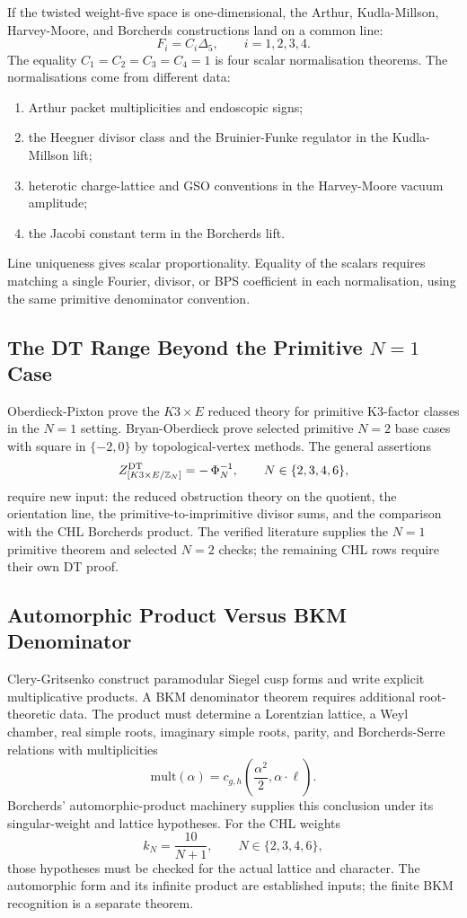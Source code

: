 If the twisted weight-five space is one-dimensional, the Arthur,
Kudla-Millson, Harvey-Moore, and Borcherds constructions land on a
common line:
\[
  F_i=C_i\Delta_5,\qquad i=1,2,3,4 .
\]
The equality \(C_1=C_2=C_3=C_4=1\) is four scalar normalisation
theorems.  The normalisations come from different data:
\begin{enumerate}[label=\textup{(\roman*)}]
\item Arthur packet multiplicities and endoscopic signs;
\item the Heegner divisor class and the Bruinier-Funke regulator in the
Kudla-Millson lift;
\item heterotic charge-lattice and GSO conventions in the
Harvey-Moore vacuum amplitude;
\item the Jacobi constant term in the Borcherds lift.
\end{enumerate}
Line uniqueness gives scalar proportionality.  Equality of the scalars
requires matching a single Fourier, divisor, or BPS coefficient in each
normalisation, using the same primitive denominator convention.

\subsection*{The DT Range Beyond the Primitive \(N=1\) Case}
\label{subsec:dt-range}

Oberdieck-Pixton prove the \(K3\times E\) reduced theory for primitive
K3-factor classes in the \(N=1\) setting.  Bryan-Oberdieck prove
selected primitive \(N=2\) base cases with square in \(\{-2,0\}\) by
topological-vertex methods.  The general assertions
\[
  Z^{\mathrm{DT}}_{[K3\times E/\mathbb{Z}_N]}
  =
  -\,\Phi_N^{-1},
  \qquad
  N\in\{2,3,4,6\},
\]
require new input: the reduced obstruction theory on the quotient, the
orientation line, the primitive-to-imprimitive divisor sums, and the
comparison with the CHL Borcherds product.  The verified literature
supplies the \(N=1\) primitive theorem and selected \(N=2\) checks; the
remaining CHL rows require their own DT proof.

\subsection*{Automorphic Product Versus BKM Denominator}
\label{subsec:automorphic-product-bkm}

Clery-Gritsenko construct paramodular Siegel cusp forms and write
explicit multiplicative products.  A BKM denominator theorem requires
additional root-theoretic data.  The product must determine a
Lorentzian lattice, a Weyl chamber, real simple roots, imaginary simple
roots, parity, and Borcherds-Serre relations with multiplicities
\[
  \mathrm{mult}(\alpha)
  =
  c_{g,h}\!\left(\frac{\alpha^2}{2},\alpha\cdot \ell\right).
\]
Borcherds' automorphic-product machinery supplies this conclusion under
its singular-weight and lattice hypotheses.  For the CHL weights
\[
  k_N=\frac{10}{N+1},\qquad N\in\{2,3,4,6\},
\]
those hypotheses must be checked for the actual lattice and character.
The automorphic form and its infinite product are established inputs;
the finite BKM recognition is a separate theorem.


